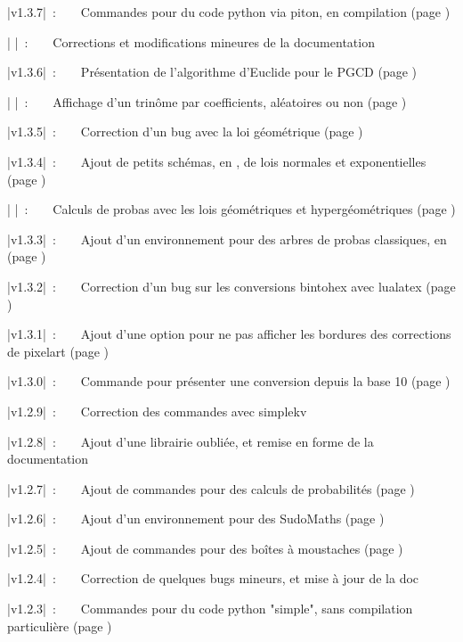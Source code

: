 \documentclass{article}
\begin{document}
{\small \bverb|v1.3.7|~:~~~~Commandes pour du code python via piton, en compilation \LuaLaTeX{} (page \pageref{pythonpiton})

{\small \bverb|      |~:~~~~Corrections et modifications mineures de la documentation

{\small \bverb|v1.3.6|~:~~~~Présentation de l'algorithme d'Euclide pour le PGCD (page \pageref{prespgcd})

{\small \bverb|      |~:~~~~Affichage d'un trinôme par coefficients, aléatoires ou non (page \pageref{trinome})

{\small \bverb|v1.3.5|~:~~~~Correction d'un bug avec la loi géométrique (page \pageref{calcprobas})
	
{\small \bverb|v1.3.4|~:~~~~Ajout de petits schémas, en \TikZ{}, de lois normales et exponentielles (page \pageref{schemasprobas})

{\small \bverb|      |~:~~~~Calculs de probas avec les lois géométriques et hypergéométriques (page \pageref{calcprobas})
	
{\small \bverb|v1.3.3|~:~~~~Ajout d'un environnement pour des arbres de probas classiques, en \TikZ{} (page \pageref{arbresprobas})
	
{\small \bverb|v1.3.2|~:~~~~Correction d'un bug sur les conversions bintohex avec lualatex (page \pageref{conversions})

{\small \bverb|v1.3.1|~:~~~~Ajout d'une option pour ne pas afficher les bordures des corrections de pixelart (page \pageref{pixelart})

{\small \bverb|v1.3.0|~:~~~~Commande pour présenter une conversion depuis la base 10 (page \pageref{convrestes})

{\small \bverb|v1.2.9|~:~~~~Correction des commandes avec \textsf{simplekv}

{\small \bverb|v1.2.8|~:~~~~Ajout d'une librairie \TikZ{} oubliée, et remise en forme de la documentation

{\small \bverb|v1.2.7|~:~~~~Ajout de commandes pour des calculs de probabilités (page \pageref{calcprobas})

{\small \bverb|v1.2.6|~:~~~~Ajout d'un environnement pour des SudoMaths (page \pageref{sudomaths})

{\small \bverb|v1.2.5|~:~~~~Ajout de commandes pour des boîtes à moustaches (page \pageref{boiteamoustaches})

{\small \bverb|v1.2.4|~:~~~~Correction de quelques bugs mineurs, et mise à jour de la doc

{\small \bverb|v1.2.3|~:~~~~Commandes pour du code python "simple", sans compilation particulière (page \pageref{pythonsimple})

}}}}}}}}}}}}}}}}}}
\end{document}
